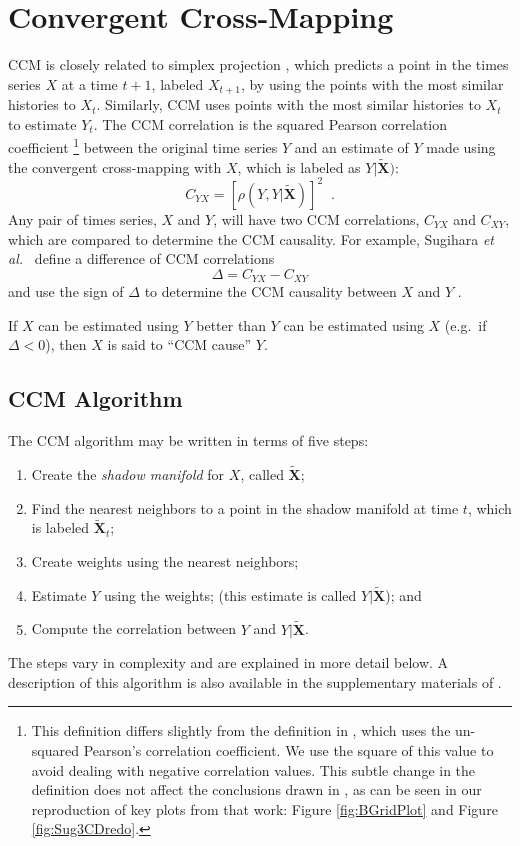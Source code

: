 \documentclass[twocolumn,aps,pre,groupedaddress]{revtex4-1}
\begin{document}
\section{Convergent Cross-Mapping}
CCM is closely related to simplex projection \cite{Sugihara1990,Sugihara1990a}, which predicts a point in the times series $X$ at a time $t+1$, labeled $X_{t+1}$, by using the points with the most similar histories to $X_t$.  Similarly, CCM uses points with the most similar histories to $X_t$ to estimate $Y_t$.  The CCM correlation is the squared Pearson correlation coefficient \footnote{This definition differs slightly from the definition in \cite{Sugihara2012}, which uses the un-squared Pearson’s correlation coefficient.  We use the square of this value to avoid dealing with negative correlation values.  This subtle change in the definition does not affect the conclusions drawn in \cite{Sugihara2012}, as can be seen in our reproduction of key plots from that work: Figure \ref{fig:BGridPlot} and Figure \ref{fig:Sug3CDredo}.} between the original time series $Y$ and an estimate of $Y$ made using the convergent cross-mapping with $X$, which is labeled as $Y|\tilde{\mathbf{X}})$:
$$
C_{YX} = \left[\rho(Y,Y|\tilde{\mathbf{X}})\right]^2\;\;.
$$
Any pair of times series, $X$ and $Y$, will have two CCM correlations, $C_{YX}$ and $C_{XY}$, which are compared to determine the CCM causality.  For example, Sugihara {\em et al.\ }\cite{Sugihara2012} define a difference of CCM correlations
\begin{equation}
\label{eqn:delta}
\Delta = C_{YX} - C_{XY}
\end{equation}
and use the sign of $\Delta$ to determine the CCM causality between $X$ and $Y$ \cite{Sugihara2012}.

If $X$ can be estimated using $Y$ better than $Y$ can be estimated using $X$ (e.g.\ if $\Delta < 0$), then $X$ is said to ``CCM cause'' $Y$.

\subsection{CCM Algorithm}
\label{sec:appA}
The CCM algorithm may be written in terms of five steps:
\begin{enumerate}
\item 
Create the {\em shadow manifold} for $X$, called $\tilde{\mathbf{X}}$;
\item Find the nearest neighbors to a point in the shadow manifold at time $t$, which is labeled $\tilde{\mathbf{X}}_t$;
\item Create weights using the nearest neighbors;
\item Estimate $Y$ using the weights; (this estimate is called $Y|\tilde{\mathbf{X}}$); and
\item Compute the correlation between $Y$ and $Y|\tilde{\mathbf{X}}$. 
\end{enumerate}
The steps vary in complexity and are explained in more detail below.  A description of this algorithm is also available in the supplementary materials of \cite{Sugihara2012}.  
\end{document}
